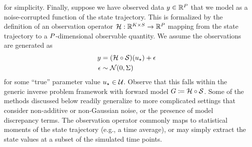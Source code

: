 \documentclass[12pt]{article}
\begin{document}
for simplicity. Finally, suppose we have observed data $y \in \mathbb{R}^{P}$ that we model as a
noise-corrupted function of the state trajectory. This is formalized by the definition of an observation operator 
$\mathcal{H}: \mathbb{R}^{K \times S} \to \mathbb{R}^{P}$ mapping from the state trajectory to a 
$P$-dimensional observable quantity. We assume the observations are generated as 
\begin{align}
y &= (\mathcal{H} \circ \mathcal{S})(u_{\star}) + \epsilon \\
\epsilon &\sim \mathcal{N}(0, \Sigma) \nonumber 
\end{align}
for some ``true'' parameter value $u_{\star} \in \mathcal{U}$. Observe that this falls within the generic 
inverse problem framework with forward model $G \coloneqq \mathcal{H} \circ \mathcal{S}$. 
Some of the methods discussed below readily 
generalize to more complicated settings that consider non-additive or non-Gaussian noise, or the presence of 
model discrepancy terms. The observation operator commonly maps to statistical moments of the state 
trajectory (e.g., a time average), or may simply extract the state values at a subset of the simulated time 
points.
\end{document}
